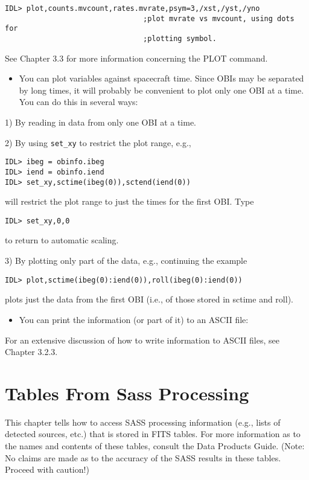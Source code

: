 \medskip\noindent
\begin{verbatim}
IDL> plot,counts.mvcount,rates.mvrate,psym=3,/xst,/yst,/yno
                                ;plot mvrate vs mvcount, using dots for
                                ;plotting symbol.
\end{verbatim}
See Chapter 3.3 for more information concerning the PLOT command.

\begin{itemize}
\item  You can plot variables against spacecraft time. Since OBIs may be separated
by long times, it will probably be convenient to plot only one OBI at a time.
You can do this in several ways:
\end{itemize}
1) By reading in data from only one OBI at a time.
 
2) By using {\tt set{\_}xy} to restrict the plot range, e.g.,

\medskip\noindent
\begin{verbatim}
IDL> ibeg = obinfo.ibeg
IDL> iend = obinfo.iend
IDL> set_xy,sctime(ibeg(0)),sctend(iend(0))
\end{verbatim}
will restrict the plot range to just the times for the first OBI. Type

\medskip\noindent
\begin{verbatim}
IDL> set_xy,0,0
\end{verbatim}
to return to automatic scaling.
 
3) By plotting only part of the data, e.g., continuing the example

\medskip\noindent
\begin{verbatim}
IDL> plot,sctime(ibeg(0):iend(0)),roll(ibeg(0):iend(0))
\end{verbatim}
plots just the data from the first OBI (i.e., of those stored in sctime and
roll).

\begin{itemize}
\item  You can print the information (or part of it) to an ASCII file:
\end{itemize}
For an extensive discussion of how to write information to ASCII files, see
Chapter 3.2.3.
 
\chapter{Tables From Sass Processing }
 
This chapter tells how to access SASS processing information (e.g., lists of
detected sources, etc.) that is stored in FITS tables. For more information as
to the names and contents of these tables, consult the Data Products Guide.
(Note: No claims are made as to the accuracy of the SASS results in these
tables. Proceed with caution!)
 

